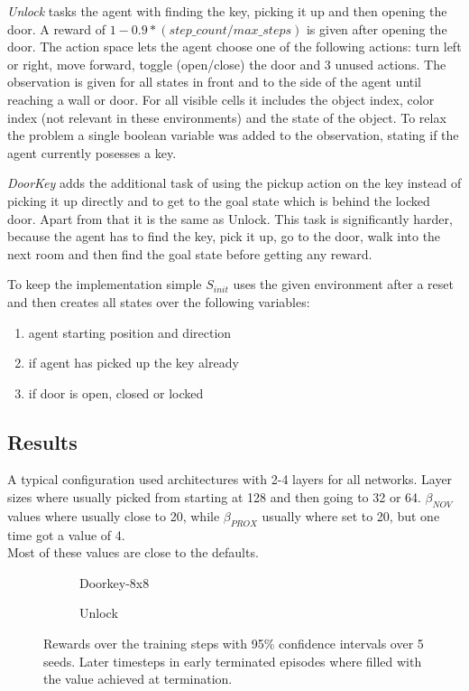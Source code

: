 \documentclass{article}
\begin{document}
\textit{Unlock} tasks the agent with finding the key, picking it up and then opening the door. A reward of $1 - 0.9 * (step\_count / max\_steps)$ is given after opening the door. The action space lets the agent choose one of the following actions: turn left or right, move forward, toggle (open/close) the door and 3 unused actions. The observation is given for all states in front and to the side of the agent until reaching a wall or door. For all visible cells it includes the object index, color index (not relevant in these environments) and the state of the object. To relax the problem a single boolean variable was added to the observation, stating if the agent currently posesses a key.

\textit{DoorKey} adds the additional task of using the pickup action on the key instead of picking it up directly and to get to the goal state which is behind the locked door. Apart from that it is the same as Unlock. This task is significantly harder, because the agent has to find the key, pick it up, go to the door, walk into the next room and then find the goal state before getting any reward.

To keep the implementation simple $S_{init}$ uses the given environment after a reset and then creates all states over the following variables:
\begin{enumerate}
  \item agent starting position and direction
  \item if agent has picked up the key already
  \item if door is open, closed or locked
\end{enumerate}

\subsection{Results}
\label{sec:results}

A typical configuration used architectures with 2-4 layers for all networks. Layer sizes where usually picked from starting at 128 and then going to 32 or 64. $\beta_{NOV}$ values where usually close to 20, while $\beta_{PROX}$ usually where set to 20, but one time got a value of 4. \\
Most of these values are close to the defaults.

\begin{figure}[ht]
  \begin{subfigure}{0.49\textwidth}
    
    \caption{Doorkey-8x8}
    \label{fig:all:doorkey8}
  \end{subfigure}
  \begin{subfigure}{0.49\textwidth}
    
    \caption{Unlock}
    \label{fig:all:unlock}
  \end{subfigure}
  \caption{Rewards over the training steps with 95\% confidence intervals over 5 seeds. Later timesteps in early terminated episodes where filled with the value achieved at termination.}
  \label{fig:all}
\end{figure}
\end{document}
